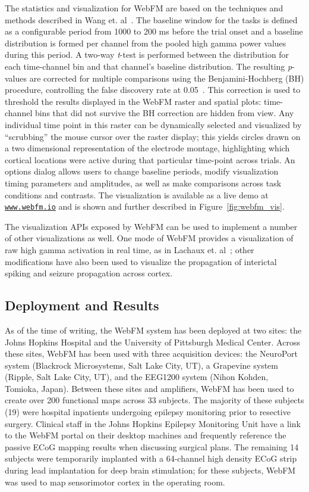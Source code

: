 \documentclass[utf8]{frontiersSCNS}
\begin{document}
The statistics and visualization for WebFM are based on the techniques and methods described in Wang et. al~\citep{wang_spatial-temporal_2016}.
The baseline window for the tasks is defined as a configurable period from 1000 to 200 ms before the trial onset and a baseline distribution is formed per channel from the pooled high gamma power values during this period.
A two-way \textit{t}-test is performed between the distribution for each time-channel bin and that channel's baseline distribution.
The resulting \textit{p}-values are corrected for multiple comparisons using the Benjamini-Hochberg (BH) procedure, controlling the false discovery rate at 0.05~\citep{benjamini_controlling_1995}.
This correction is used to threshold the results displayed in the WebFM raster and spatial plots: time-channel bins that did not survive the BH correction are hidden from view.
Any individual time point in this raster can be dynamically selected and visualized by ``scrubbing'' the mouse cursor over the raster display; this yields circles drawn on a two dimensional representation of the electrode montage, highlighting which cortical locations were active during that particular time-point across trials.
An options dialog allows users to change baseline periods, modify visualization timing parameters and amplitudes, as well as make comparisons across task conditions and contrasts.
The visualization is available as a live demo at \href{http://www.webfm.io}{\texttt{www.webfm.io}} and is shown and further described in Figure~\ref{fig:webfm_vis}.

The visualization APIs exposed by WebFM can be used to implement a number of other visualizations as well.
One mode of WebFM provides a visualization of raw high gamma activation in real time, as in Lachaux et. al~\citep{lachaux_braintv:_2007}; other modifications have also been used to visualize the propagation of interictal spiking and seizure propagation across cortex.


\subsection{Deployment and Results}

As of the time of writing, the WebFM system has been deployed at two sites: the Johns Hopkins Hospital and the University of Pittsburgh Medical Center.
Across these sites, WebFM has been used with three acquisition devices: the NeuroPort system (Blackrock Microsystems, Salt Lake City, UT), a Grapevine system (Ripple, Salt Lake City, UT), and the EEG1200 system (Nihon Kohden, Tomioka, Japan).
Between these sites and amplifiers, WebFM has been used to create over 200 functional maps across 33 subjects.
The majority of these subjects (19) were hospital inpatients undergoing epilepsy monitoring prior to resective surgery.
Clinical staff in the Johns Hopkins Epilepsy Monitoring Unit have a link to the WebFM portal on their desktop machines and frequently reference the passive ECoG mapping results when discussing surgical plans.
The remaining 14 subjects were temporarily implanted with a 64-channel high density ECoG strip during lead implantation for deep brain stimulation; for these subjects, WebFM was used to map sensorimotor cortex in the operating room.
\end{document}
